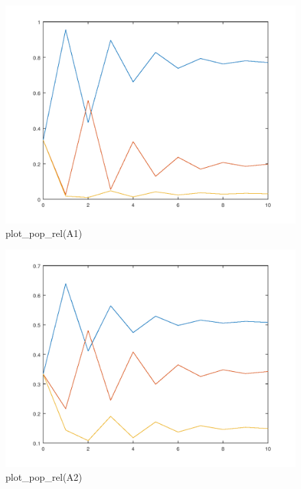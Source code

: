 \documentclass{article}
\begin{document}
\begin{figure}[H]
\centering
\includegraphics[scale=0.5]{plotrelA1.png}
\caption{plot\_pop\_rel(A1)}
\label{fig:universe}
\end{figure}

\begin{figure}[H]
\centering
\includegraphics[scale=0.5]{plotrelA2.png}
\caption{plot\_pop\_rel(A2)}
\label{fig:universe}
\end{figure}
\end{document}
